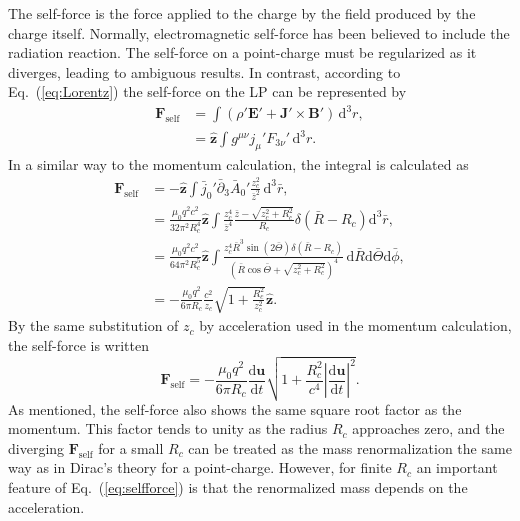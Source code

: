 \documentclass[a4paper,fleqn]{cas-sc}
\begin{document}
The self-force is the force applied to the charge by the field produced by the charge itself. Normally, electromagnetic self-force has been believed to include the radiation reaction. The self-force on a point-charge must be regularized as it diverges, leading to ambiguous results. In contrast, according to Eq.~(\ref{eq:Lorentz}) the self-force on the LP can be represented by
\begin{align}
\mathbf{F}_{\mathrm{self}} &= \int (\rho'\mathbf{E}' + \mathbf{J}' \times \mathbf{B}') \,\mathrm{d}^{3}r , \nonumber \\
&= \hat{\mathbf{z}} \int g^{\mu\nu} j_{\mu}' F_{3\nu}' \,\mathrm{d}^{3}r .
\end{align}
In a similar way to the momentum calculation, the integral is calculated as
\begin{align}
\mathbf{F}_{\mathrm{self}} &= -\hat{\mathbf{z}} \int \bar{j}_{0}' \bar{\partial}_{3} \bar{A}_{0}' \displaystyle\frac{z_{c}^{2}}{\bar{z}^{2}} \,\mathrm{d}^{3}\bar{r} , \nonumber \\
&= \displaystyle\frac{\mu_{0}q^{2}c^{2}}{32\pi^{2} R_{c}^{4}} \hat{\mathbf{z}} \int \displaystyle\frac{z_{c}^{4}}{\bar{z}^{4}} \displaystyle\frac{\bar{z} - \sqrt{z_{c}^{2}+R_{c}^{2}}}{R_{c}} \delta\left(\bar{R}-R_{c}\right) \mathrm{d}^{3}\bar{r} , \nonumber \\
&= \displaystyle\frac{\mu_{0}q^{2}c^{2}}{64\pi^{2} R_{c}^{5}} \hat{\mathbf{z}} \int \displaystyle\frac{z_{c}^{4}\bar{R}^{3}\sin\left(2\bar{\Theta}\right) \delta\left(\bar{R}-R_{c}\right)}{\left(\bar{R}\cos\bar{\Theta} + \sqrt{z_{c}^{2}+R_{c}^{2}}\right)^{4}} \,\mathrm{d}\bar{R}\mathrm{d}\bar{\Theta}\mathrm{d}\bar{\phi} , \nonumber \\
&= -\displaystyle\frac{\mu_{0}q^{2}}{6\pi R_{c}} \displaystyle\frac{c^{2}}{z_{c}} \sqrt{1 + \displaystyle\frac{R_{c}^{2}}{z_{c}^{2}}} \hat{\mathbf{z}} .
\end{align}
By the same substitution of $z_{c}$ by acceleration used in the momentum calculation, the self-force is written
\begin{equation}
\mathbf{F}_{\mathrm{self}} = -\displaystyle\frac{\mu_{0}q^{2}}{6\pi R_{c}} \displaystyle\frac{\mathrm{d}\mathbf{u}}{\mathrm{d}t} \sqrt{1 + \displaystyle\frac{R_{c}^{2}}{c^{4}} \left|\displaystyle\frac{\mathrm{d}\mathbf{u}}{\mathrm{d}t}\right|^{2}} . \label{eq:selfforce}
\end{equation}
As mentioned, the self-force also shows the same square root factor as the momentum. This factor tends to unity as the radius $R_{c}$ approaches zero, and the diverging $\mathbf{F}_{\mathrm{self}}$ for a small $R_{c}$ can be treated as the mass renormalization the same way as in Dirac's theory for a point-charge. However, for finite $R_{c}$ an important feature of Eq.~(\ref{eq:selfforce}) is that the renormalized mass depends on the acceleration.
\end{document}
